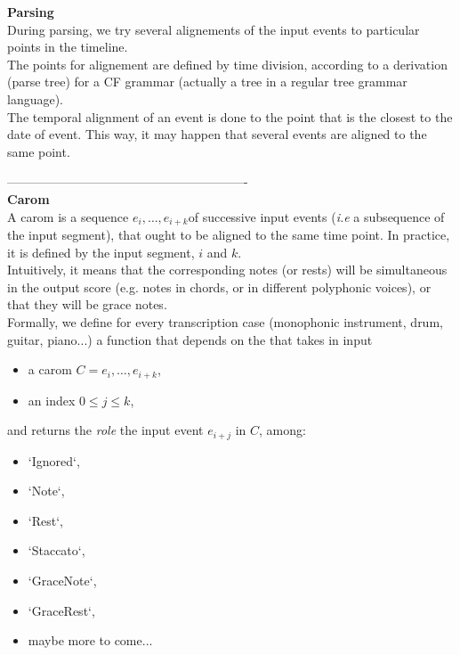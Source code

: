 \textbf{Parsing}\\

During parsing, we try several alignements of the input events to particular points in the timeline.\\
The points for alignement are defined by time division, according to a derivation (parse tree) for a CF grammar (actually a tree in a regular tree grammar language).\\

The temporal alignment of an event is done to the point that is the closest to the date of event.
This way, it may happen that several events are aligned to the same point.\\
\newpage

----------------------------------------------------------\\

\textbf{Carom}\\

A carom is a sequence $e_i,\ldots, e_{i+k}$​​ of successive input events (\textit{i.e} a subsequence of the input segment), that ought to be aligned to the same time point. In practice, it is defined by the input segment, $i$ and $k$.\\

Intuitively, it means that the corresponding notes (or rests) will be simultaneous in the output score (e.g. notes in chords, or in different polyphonic voices), or that they will be grace notes.\\

Formally, we define for every transcription case (monophonic instrument, drum, guitar, piano...) a function that depends on the that takes in input\\
\begin{itemize}
	\item a carom $C = e_i,\ldots, e_{i+k}$,
	\item an index $0 \leq j \leq k$,\\
\end{itemize}


and returns the \textit{role} the input event  $e_{i+j}$ in $C$, among:\\
\begin{itemize}
	\item `Ignored`,
	\item `Note`,
	\item `Rest`,
	\item `Staccato`,
	\item `GraceNote`,
	\item `GraceRest`,
	\item maybe more to come...\\
\end{itemize}

